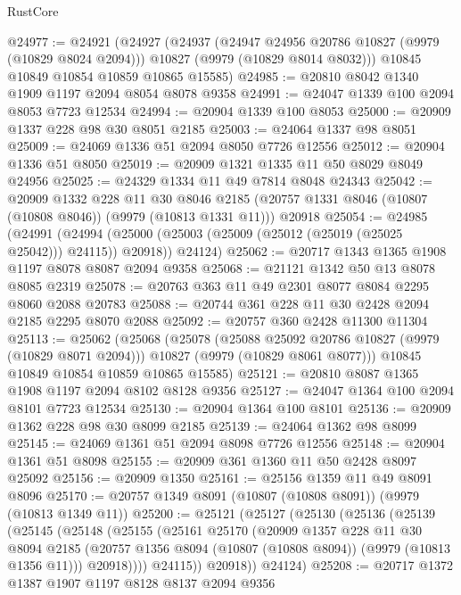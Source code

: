 \begin{lexlean}{RustCore}
\begin{coremodule}
@24977 := @24921
    (@24927
      (@24937
        (@24947 @24956 @20786 @10827 (@9979 (@10829 @8024 @2094)))
        @10827
        (@9979 (@10829 @8014 @8032)))
      @10845
      @10849
      @10854
      @10859
      @10865
      @15585)
@24985 := @20810 @8042 @1340 @1909 @1197 @2094 @8054 @8078 @9358
@24991 := @24047 @1339 @100 @2094 @8053 @7723 @12534
@24994 := @20904 @1339 @100 @8053
@25000 := @20909 @1337 @228 @98 @30 @8051 @2185
@25003 := @24064 @1337 @98 @8051
@25009 := @24069 @1336 @51 @2094 @8050 @7726 @12556
@25012 := @20904 @1336 @51 @8050
@25019 := @20909 @1321 @1335 @11 @50 @8029 @8049 @24956
@25025 := @24329 @1334 @11 @49 @7814 @8048 @24343
@25042 := @20909
    @1332
    @228
    @11
    @30
    @8046
    @2185
    (@20757 @1331 @8046 (@10807 (@10808 @8046)) (@9979 (@10813 @1331 @11)))
    @20918
@25054 := @24985
    (@24991
      (@24994 (@25000 (@25003 (@25009 (@25012 (@25019 (@25025 @25042))) @24115)) @20918))
      @24124)
@25062 := @20717 @1343 @1365 @1908 @1197 @8078 @8087 @2094 @9358
@25068 := @21121 @1342 @50 @13 @8078 @8085 @2319
@25078 := @20763 @363 @11 @49 @2301 @8077 @8084 @2295 @8060 @2088 @20783
@25088 := @20744 @361 @228 @11 @30 @2428 @2094 @2185 @2295 @8070 @2088
@25092 := @20757 @360 @2428 @11300 @11304
@25113 := @25062
    (@25068
      (@25078
        (@25088 @25092 @20786 @10827 (@9979 (@10829 @8071 @2094)))
        @10827
        (@9979 (@10829 @8061 @8077)))
      @10845
      @10849
      @10854
      @10859
      @10865
      @15585)
@25121 := @20810 @8087 @1365 @1908 @1197 @2094 @8102 @8128 @9356
@25127 := @24047 @1364 @100 @2094 @8101 @7723 @12534
@25130 := @20904 @1364 @100 @8101
@25136 := @20909 @1362 @228 @98 @30 @8099 @2185
@25139 := @24064 @1362 @98 @8099
@25145 := @24069 @1361 @51 @2094 @8098 @7726 @12556
@25148 := @20904 @1361 @51 @8098
@25155 := @20909 @361 @1360 @11 @50 @2428 @8097 @25092
@25156 := @20909 @1350
@25161 := @25156 @1359 @11 @49 @8091 @8096
@25170 := @20757 @1349 @8091 (@10807 (@10808 @8091)) (@9979 (@10813 @1349 @11))
@25200 := @25121
    (@25127
      (@25130
        (@25136
          (@25139
            (@25145
              (@25148
                (@25155
                  (@25161
                    @25170
                    (@20909
                      @1357
                      @228
                      @11
                      @30
                      @8094
                      @2185
                      (@20757 @1356 @8094 (@10807 (@10808 @8094)) (@9979 (@10813 @1356 @11)))
                      @20918))))
              @24115))
          @20918))
      @24124)
@25208 := @20717 @1372 @1387 @1907 @1197 @8128 @8137 @2094 @9356

\end{coremodule}
\end{lexlean}
